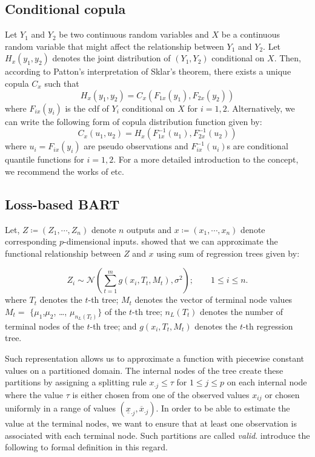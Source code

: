 \documentclass{amsart}
\begin{document}
\subsection{Conditional copula}
Let $Y_1$ and $Y_2$ be two continuous random variables and $X$ be a continuous random variable that might affect the relationship between $Y_1$ and $Y_2$. Let $H_x(y_1,y_2)$ denotes the joint distribution of $(Y_1,Y_2)$ conditional on $X$. Then, according to Patton's\cite{patton2006} interpretation of Sklar's\cite{sklar:1959} theorem, there exists a unique copula $C_x$ such that
\begin{equation*}
	H_x(y_1,y_2) = C_x(F_{1x}(y_1),F_{2x}(y_2))
\end{equation*}
where $F_{ix}(y_i)$ is the cdf of $Y_i$ conditional on $X$ for $i=1,2$. Alternatively, we can write the following form of copula distribution function given by:
\begin{equation*}
	C_x(u_1,u_2) = H_x\left(F_{1x}^{-1}(u_1),F_{2x}^{-1}(u_2)\right)
\end{equation*}
where $u_i = F_{ix}(y_i)$ are pseudo observations and $F_{ix}^{-1}(u_i)$s are conditional quantile functions
for $i=1,2$. For a more detailed introduction to the concept, we recommend the works of \citet{patton2006,acar2010,GIJBELS20111919} etc.

\subsection{Loss-based BART}

Let, $Z\coloneqq(Z_1,\cdots,Z_n)$ denote $n$ outputs and $x\coloneqq(x_1,\cdots,x_n)$ denote corresponding $p$-dimensional inputs. \citet{chipman2010BART} showed that we can approximate the functional relationship between $Z$ and $x$ using sum of regression trees given by:

\begin{equation}\label{eq:BART}
	Z_i \sim \mathcal{N}\left(\sum_{t=1}^m g(x_i, T_t, M_t),\sigma^2\right);\qquad 1\le i\le n.
\end{equation}
where $T_t$ denotes the $t$-th tree; $M_t$ denotes the vector of terminal node values $M_t =$ $\{\mu_1$,$\mu_2$, \dots, $\mu_{n_L(T_t)}\}$ of the $t$-th tree; $n_L(T_t)$ denotes the number of terminal nodes of the $t$-th tree; and $g(x_i, T_t, M_t)$ denotes the $t$-th regression tree.

Such representation allows us to approximate a function with piecewise constant values on a partitioned domain. The internal nodes of the tree create these partitions by assigning a splitting rule $x_{\cdot j}\le \tau$ for $1\le j \le p$ on each internal node where the value $\tau$ is either chosen from one of the observed values $x_{ij}$ or chosen uniformly in a range of values $(\underline{x}_{\cdot j},\overline{x}_{\cdot j})$. In order to be able to estimate the value at the terminal nodes, we want to ensure that at least one observation is associated with each terminal node. Such partitions are called \textit{valid}.  \citet{serafini2024lossbasedpriortreetopologies} introduce the following to formal definition in this regard.
\end{document}
